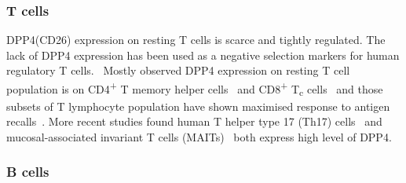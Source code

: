\subsubsection{T cells}
DPP4(CD26) expression on resting T cells is scarce and tightly regulated. The lack of DPP4 expression has been used as a negative selection markers for human regulatory T cells.~\cite{Salgado2012,Garcia2014} Mostly observed DPP4 expression on resting T cell population is on CD4\textsuperscript{+} T memory helper cells~\cite{Gorrell1991, Morimoto1998} and CD8\textsuperscript{+} T\textsubscript{c} cells~\cite{Waumans2015,Hatano2013} and those subsets of T lymphocyte population have shown maximised response to antigen recalls~\cite{Waumans2015,Morimoto1998,Hatano2013}. More recent studies found human T helper type 17 (Th17) cells~\cite{Bengsch2012} and mucosal-associated invariant T cells (MAITs)~\cite{Sharma2015} both express high level of DPP4.

\subsubsection{B cells}
